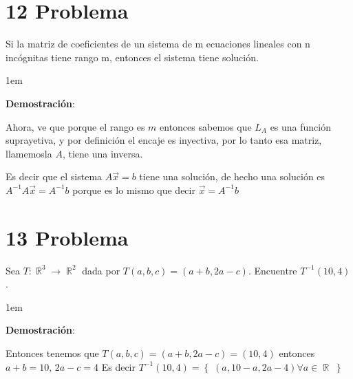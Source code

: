 \documentclass[12pt, fleqn]{article}                             %
\newenvironment{SmallIndentation}[1][0.75em]                    %
        {\begin{adjustwidth}{#1}{}\begin{footnotesize}}             %
        {\end{footnotesize}\end{adjustwidth}}                       %
\theoremstyle{break}                                            %
\DeclareMathOperator \Reals        {\mathbb{R}}                 %
\newcommand{\Set}[1]    {\left\{ \; #1 \; \right\}}             %
\begin{document}
\vspace{1em}
\section{12 Problema}

    Si la matriz de coeficientes de un sistema de m ecuaciones lineales
    con n incógnitas tiene rango m, entonces el sistema tiene
    solución.

    \begin{SmallIndentation}[1em]
        \textbf{Demostración}:
        
        Ahora, ve que porque el rango es $m$ entonces sabemos que $L_A$ es una función suprayetiva, y por definición
        el encaje es inyectiva, por lo tanto esa matriz, llamemosla $A$, tiene una inversa.

        Es decir que el sistema $A \vec x = b$ tiene una solución, de hecho una solución es $A^{-1}A \vec x = A^{-1}b$
        porque es lo mismo que decir $\vec x = A^{-1}b$

    \end{SmallIndentation}



\vspace{1em}
\section{13 Problema}

    Sea $T: \Reals^3 \to \Reals^2$ dada por $T(a, b, c) = (a + b, 2a - c)$. Encuentre $T^{-1}(10, 4)$.

    \begin{SmallIndentation}[1em]
        \textbf{Demostración}:
        
        Entonces tenemos que $T(a, b, c) = (a + b, 2a - c) = (10, 4)$ entonces $a + b = 10$, $2a - c = 4$
        Es decir $T^{-1}(10, 4) = \Set{(a, 10 - a, 2a - 4) \forall a \in \Reals}$

    \end{SmallIndentation}
\end{document}
